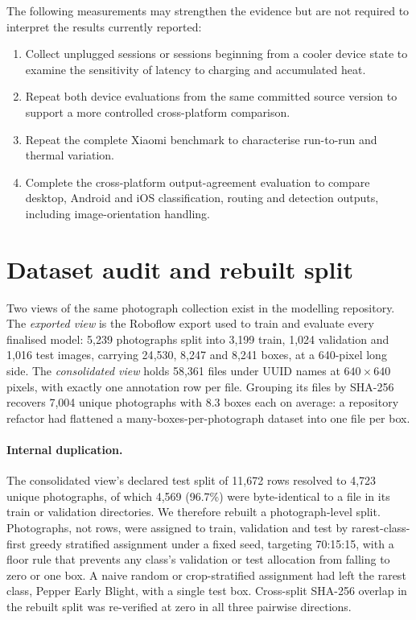 \documentclass[preprint,12pt,authoryear]{elsarticle}
\begin{document}
The following measurements may strengthen the evidence but are not required
to interpret the results currently reported:

\begin{enumerate}
  \item Collect unplugged sessions or sessions beginning from a cooler device
  state to examine the sensitivity of latency to charging and accumulated
  heat.

  \item Repeat both device evaluations from the same committed source version
  to support a more controlled cross-platform comparison.

  \item Repeat the complete Xiaomi benchmark to characterise run-to-run and
  thermal variation.

  \item Complete the cross-platform output-agreement evaluation to compare
  desktop, Android and iOS classification, routing and detection outputs,
  including image-orientation handling.
\end{enumerate}


\section{Dataset audit and rebuilt split}
\label{sup:audit}

Two views of the same photograph collection exist in the modelling repository.
The \emph{exported view} is the Roboflow export used to train and evaluate every finalised model: 5{,}239 photographs split into 3{,}199 train, 1{,}024 validation and 1{,}016 test images, carrying 24{,}530, 8{,}247 and 8{,}241 boxes, at a 640-pixel long side.
The \emph{consolidated view} holds 58{,}361 files under UUID names at $640 \times 640$ pixels, with exactly one annotation row per file.
Grouping its files by SHA-256 recovers 7{,}004 unique photographs with 8.3 boxes each on average: a repository refactor had flattened a many-boxes-per-photograph dataset into one file per box.

\paragraph{Internal duplication.}
The consolidated view's declared test split of 11{,}672 rows resolved to 4{,}723 unique photographs, of which 4{,}569 (96.7\%) were byte-identical to a file in its train or validation directories.
We therefore rebuilt a photograph-level split.
Photographs, not rows, were assigned to train, validation and test by rarest-class-first greedy stratified assignment under a fixed seed, targeting 70:15:15, with a floor rule that prevents any class's validation or test allocation from falling to zero or one box.
A naive random or crop-stratified assignment had left the rarest class, Pepper Early Blight, with a single test box.
Cross-split SHA-256 overlap in the rebuilt split was re-verified at zero in all three pairwise directions.
\end{document}
